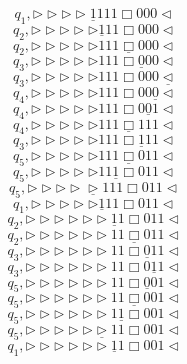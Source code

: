 \documentclass[12pt,a4paper]{article}
\theoremstyle{definition}
\begin{document}
\begin{enumerate}
\begin{enumerate}
			$$q_1,\triangleright\triangleright\triangleright\triangleright\underline{1}111\Box000\triangleleft$$
			$$q_2,\triangleright\triangleright\triangleright\triangleright\triangleright\underline{1}11\Box000\triangleleft$$
			$$q_2,\triangleright\triangleright\triangleright\triangleright\triangleright111\underline{\Box}000\triangleleft$$
			$$q_3,\triangleright\triangleright\triangleright\triangleright\triangleright111\Box\underline{0}00\triangleleft$$
			$$q_3,\triangleright\triangleright\triangleright\triangleright\triangleright111\Box000\underline{\triangleleft}$$
			$$q_4,\triangleright\triangleright\triangleright\triangleright\triangleright111\Box00\underline{0}\triangleleft$$
			$$q_4,\triangleright\triangleright\triangleright\triangleright\triangleright111\Box0\underline{0}1\triangleleft$$
			$$q_4,\triangleright\triangleright\triangleright\triangleright\triangleright111\underline{\Box}111\triangleleft$$
			$$q_3,\triangleright\triangleright\triangleright\triangleright\triangleright111\Box\underline{1}11\triangleleft$$
			$$q_5,\triangleright\triangleright\triangleright\triangleright\triangleright111\underline{\Box}011\triangleleft$$
			$$q_5,\triangleright\triangleright\triangleright\triangleright\triangleright11\underline{1}\Box011\triangleleft$$
			$$q_5,\triangleright\triangleright\triangleright\triangleright\underline{\triangleright}111\Box011\triangleleft$$
			$$q_1,\triangleright\triangleright\triangleright\triangleright\triangleright\underline{1}11\Box011\triangleleft$$
			$$q_2,\triangleright\triangleright\triangleright\triangleright\triangleright\triangleright\underline{1}1\Box011\triangleleft$$
			$$q_2,\triangleright\triangleright\triangleright\triangleright\triangleright\triangleright11\underline{\Box}011\triangleleft$$
			$$q_3,\triangleright\triangleright\triangleright\triangleright\triangleright\triangleright11\Box\underline{0}11\triangleleft$$
			$$q_3,\triangleright\triangleright\triangleright\triangleright\triangleright\triangleright11\Box0\underline{1}1\triangleleft$$
			$$q_5,\triangleright\triangleright\triangleright\triangleright\triangleright\triangleright11\Box\underline{0}01\triangleleft$$
			$$q_5,\triangleright\triangleright\triangleright\triangleright\triangleright\triangleright11\underline{\Box}001\triangleleft$$
			$$q_5,\triangleright\triangleright\triangleright\triangleright\triangleright\triangleright1\underline{1}\Box001\triangleleft$$
			$$q_5,\triangleright\triangleright\triangleright\triangleright\triangleright\underline{\triangleright}11\Box001\triangleleft$$
			$$q_1,\triangleright\triangleright\triangleright\triangleright\triangleright\triangleright\underline{1}1\Box001\triangleleft$$

\end{enumerate}
\end{enumerate}
\end{document}
